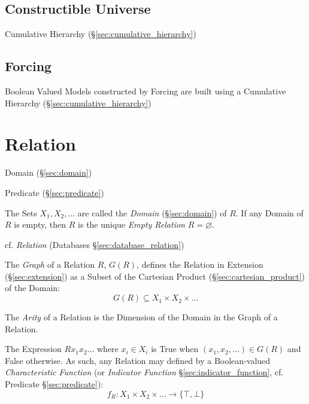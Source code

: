 


\subsection{Constructible Universe}\label{sec:constrictible_universe}

Cumulative Hierarchy (\S\ref{sec:cumulative_hierarchy})



\subsection{Forcing}\label{sec:forcing}

Boolean Valued Models constructed by Forcing are built using a
Cumulative Hierarchy (\S\ref{sec:cumulative_hierarchy})



\section{Relation}\label{sec:set_relation}

Domain (\S\ref{sec:domain})

Predicate (\S\ref{sec:predicate})

The Sets $X_1, X_2, \ldots$ are called the \emph{Domain}
(\S\ref{sec:domain}) of $R$. If any Domain of $R$ is empty, then $R$
is the unique \emph{Empty Relation} $R = \varnothing$.

\fist cf. \emph{Relation} (Databases \S\ref{sec:database_relation})

The \emph{Graph} of a Relation $R$, $G(R)$, defines the Relation in
Extension (\S\ref{sec:extension}) as a Subset of the Cartesian Product
(\S\ref{sec:cartesian_product}) of the Domain:
\[
  G(R) \subseteq X_1 \times X_2 \times \ldots
\]

The \emph{Arity} of a Relation is the Dimension of the Domain in the
Graph of a Relation. %

The Expression $R x_1 x_2 \ldots$ where $x_i \in X_i$ is True when
$(x_1, x_2, \ldots) \in G(R)$ and False otherwise. As such, any
Relation may defined by a Boolean-valued \emph{Characteristic
  Function} (or \emph{Indicator Function}
\S\ref{sec:indicator_function}, cf. Predicate \S\ref{sec:predicate}):
\[
  f_R : X_1 \times X_2 \times \ldots \rightarrow \{\top,\bot\}
\]

